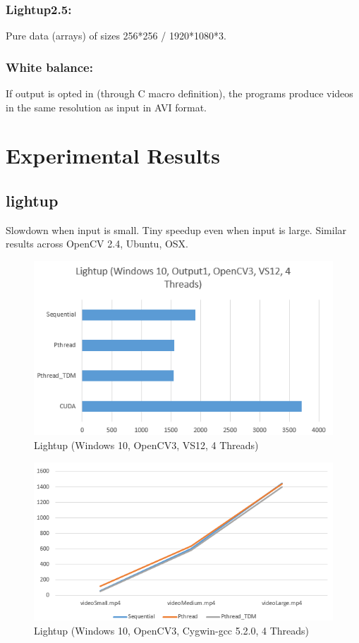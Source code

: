 \documentclass{acm_proc_article-sp}
\begin{document}
\subsubsection{Lightup2.5:}
Pure data (arrays) of sizes 256*256 / 1920*1080*3.
\subsubsection{White balance:}
If output is opted in (through C macro definition), the programs produce videos in the same resolution as input in AVI format. 

\section{Experimental Results}
\subsection{lightup}
Slowdown when input is small. Tiny speedup even when input is large. Similar results across OpenCV 2.4, Ubuntu, OSX.
\begin{figure}[H]
  \includegraphics[width=\linewidth,natwidth=526,natheight=307]{lightup.png}
  \caption{Lightup (Windows 10, OpenCV3, VS12, 4 Threads)}
  \label{fig:lightup}
\end{figure}
\begin{figure}[H]
  \includegraphics[width=\linewidth,natwidth=579,natheight=307]{lightup_sml.png}
  \caption{Lightup (Windows 10, OpenCV3, Cygwin-gcc 5.2.0, 4 Threads)}
  \label{fig:lightup_sml}
\end{figure}
\end{document}
